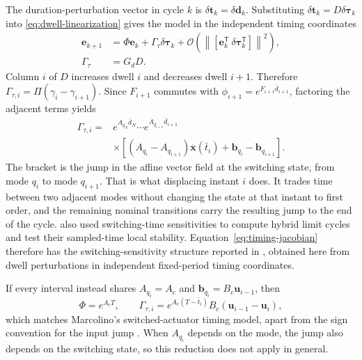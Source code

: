 \documentclass[pdflatex,iicol,sn-mathphys-ay]{sn-jnl}
\newcommand{\vect}[1]{\bm{#1}}
\newcommand{\dtau}{\delta\vect{\tau}}
\newcommand{\ddwell}{\delta\vect{d}}
\begin{document}
The duration-perturbation vector in cycle $k$ is $\delta\boldsymbol{t}_k=\ddwell_k$. Substituting $\delta\boldsymbol{t}_k=D\dtau_k$ into \eqref{eq:dwell-linearization} gives the model in the independent timing coordinates
\begin{equation}
\begin{aligned}
    \vect{e}_{k+1}&=\Phi\vect{e}_k+\Gamma_\tau\dtau_k
    +\mathcal O\!\left(\left\|[\vect{e}_k^{\mathsf T}\ \dtau_k^{\mathsf T}]\right\|^2\right),\\
    \Gamma_\tau&=G_dD.
\end{aligned}
\label{eq:cycle-model}
\end{equation}
Column $i$ of $D$ increases dwell $i$ and decreases dwell $i+1$. Therefore $\Gamma_{\tau,i}=\Pi(\gamma_i-\gamma_{i+1})$. Since $F_{i+1}$ commutes with $\phi_{i+1}=e^{F_{i+1}\bar d_{i+1}}$, factoring the adjacent terms yields
\begin{equation}
\begin{split}
    \Gamma_{\tau,i}={}&e^{A_{q_N}\bar d_N}\cdots
    e^{A_{q_{i+1}}\bar d_{i+1}}\\
    &\times\left[(A_{q_i}-A_{q_{i+1}})\bar{\vect{x}}(\bar t_i)
    +\vect{b}_{q_i}-\vect{b}_{q_{i+1}}\right].
\end{split}
\label{eq:timing-jacobian}
\end{equation}
The bracket is the jump in the affine vector field at the switching state, from mode $q_i$ to mode $q_{i+1}$. That is what displacing instant $i$ does. It trades time between two adjacent modes without changing the state at that instant to first order, and the remaining nominal transitions carry the resulting jump to the end of the cycle. \cite{flieller2006limitCycles} also used switching-time sensitivities to compute hybrid limit cycles and test their sampled-time local stability. Equation~\eqref{eq:timing-jacobian} therefore has the switching-sensitivity structure reported in \cite{patino2010}, obtained here from dwell perturbations in independent fixed-period timing coordinates.

If every interval instead shares $A_{q_i}=A_c$ and $\vect{b}_{q_i}=B_c\vect{u}_{i-1}$, then
\begin{equation}
    \Phi=e^{A_cT},\qquad
    \Gamma_{\tau,i}=e^{A_c(T-\bar t_i)}B_c(\vect{u}_{i-1}-\vect{u}_i),
    \label{eq:marcolino-specialization}
\end{equation}
which matches Marcolino's switched-actuator timing model, apart from the sign convention for the input jump \cite{marcolino2021}. When $A_{q_i}$ depends on the mode, the jump also depends on the switching state, so this reduction does not apply in general.
\end{document}
